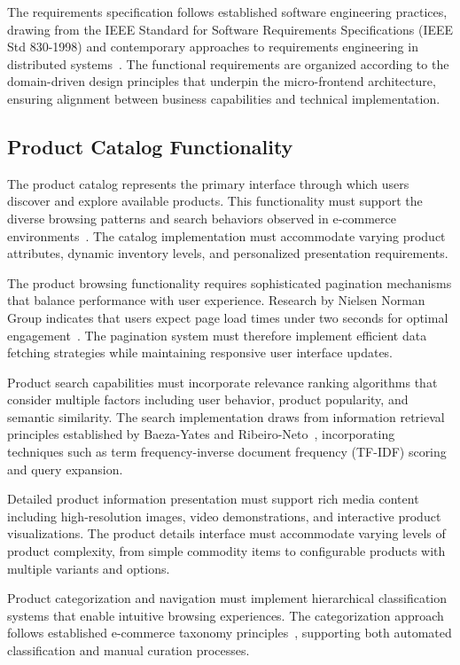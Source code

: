 \documentclass[12pt,a4paper]{report}
\begin{document}
The requirements specification follows established software engineering practices, drawing from the IEEE Standard for Software Requirements Specifications (IEEE Std 830-1998) and contemporary approaches to requirements engineering in distributed systems~\cite{ieee1998requirements}. The functional requirements are organized according to the domain-driven design principles that underpin the micro-frontend architecture, ensuring alignment between business capabilities and technical implementation.

\subsection{Product Catalog Functionality}

The product catalog represents the primary interface through which users discover and explore available products. This functionality must support the diverse browsing patterns and search behaviors observed in e-commerce environments~\cite{nielsen2012ecommerce}. The catalog implementation must accommodate varying product attributes, dynamic inventory levels, and personalized presentation requirements.

The product browsing functionality requires sophisticated pagination mechanisms that balance performance with user experience. Research by Nielsen Norman Group indicates that users expect page load times under two seconds for optimal engagement~\cite{nielsen2012ecommerce}. The pagination system must therefore implement efficient data fetching strategies while maintaining responsive user interface updates.

Product search capabilities must incorporate relevance ranking algorithms that consider multiple factors including user behavior, product popularity, and semantic similarity. The search implementation draws from information retrieval principles established by Baeza-Yates and Ribeiro-Neto~\cite{baeza2011modern}, incorporating techniques such as term frequency-inverse document frequency (TF-IDF) scoring and query expansion.

Detailed product information presentation must support rich media content including high-resolution images, video demonstrations, and interactive product visualizations. The product details interface must accommodate varying levels of product complexity, from simple commodity items to configurable products with multiple variants and options.

Product categorization and navigation must implement hierarchical classification systems that enable intuitive browsing experiences. The categorization approach follows established e-commerce taxonomy principles~\cite{berendt2001mining}, supporting both automated classification and manual curation processes.
\end{document}
